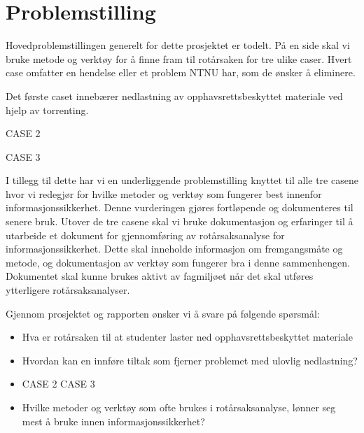 \section{Problemstilling}
\label{sec:problemstilling}
Hovedproblemstillingen generelt for dette prosjektet er todelt. På en side skal vi bruke metode og verktøy for å finne fram til rotårsaken for tre ulike caser. Hvert case omfatter en hendelse eller et problem NTNU har, som de ønsker å eliminere. 

Det første caset innebærer nedlastning av opphavsrettsbeskyttet materiale ved hjelp av torrenting. 


CASE 2

CASE 3

I tillegg til dette har vi en underliggende problemstilling knyttet til alle tre casene hvor vi redegjør for hvilke metoder og verktøy som fungerer best innenfor informasjonssikkerhet. Denne vurderingen gjøres fortløpende og dokumenteres til senere bruk. Utover de tre casene skal vi bruke dokumentasjon og erfaringer til å utarbeide et dokument for gjennomføring av rotårsaksanalyse for informasjonssikkerhet. Dette skal inneholde informasjon om fremgangsmåte og metode, og dokumentasjon av verktøy som fungerer bra i denne sammenhengen. Dokumentet skal kunne brukes aktivt av fagmiljøet når det skal utføres ytterligere rotårsaksanalyser.

Gjennom prosjektet og rapporten ønsker vi å svare på følgende spørsmål:

\begin{itemize}
    \item Hva er rotårsaken til at studenter laster ned opphavsrettsbeskyttet materiale
    \item Hvordan kan en innføre tiltak som fjerner problemet med ulovlig nedlastning?
    \item CASE 2
    \itme CASE 3
    \item Hvilke metoder og verktøy som ofte brukes i rotårsaksanalyse, lønner seg mest å bruke innen informasjonssikkerhet?
\end{itemize}